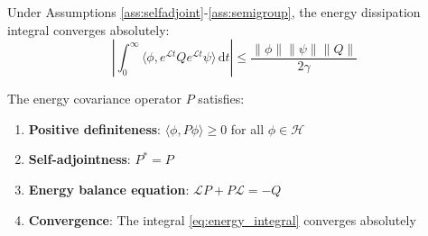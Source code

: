 \documentclass[10pt,a4paper]{amsart}
\def\H{\mathcal{H}}
\newcommand{\dd}{\,\mathrm{d}}
\newcommand{\inner}[2]{\langle #1, #2 \rangle}
\begin{document}
\begin{theorem}\label{thm:rigorous_convergence}
Under Assumptions \ref{ass:selfadjoint}-\ref{ass:semigroup}, the energy dissipation integral converges absolutely:
\begin{equation}
\left|\int_0^{\infty} \inner{\phi}{e^{\mathcal{L}t} Q e^{\mathcal{L}t} \psi} \dd t\right| \leq \frac{\|\phi\|\|\psi\|\|Q\|}{2\gamma}
\end{equation}
\end{theorem}

\begin{theorem}\label{thm:covariance_properties}
The energy covariance operator $P$ satisfies:
\begin{enumerate}
\item \textbf{Positive definiteness}: $\inner{\phi}{P\phi} \geq 0$ for all $\phi \in \H$
\item \textbf{Self-adjointness}: $P^* = P$
\item \textbf{Energy balance equation}: $\mathcal{L}P + P\mathcal{L} = -Q$
\item \textbf{Convergence}: The integral \eqref{eq:energy_integral} converges absolutely
\end{enumerate}
\end{theorem}
\end{document}

